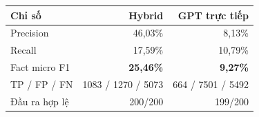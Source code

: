 \begin{tabularx}{\linewidth}{@{}Yrr@{}}
\toprule
\textbf{Chỉ số} & \textbf{Hybrid} & \textbf{GPT trực tiếp} \\\midrule
Precision & 46,03\% & 8,13\% \\
Recall & 17,59\% & 10,79\% \\
Fact micro F1 & \textbf{25,46\%} & \textbf{9,27\%} \\
TP / FP / FN & 1083 / 1270 / 5073 & 664 / 7501 / 5492 \\
Đầu ra hợp lệ & 200/200 & 199/200 \\
\bottomrule
\end{tabularx}
